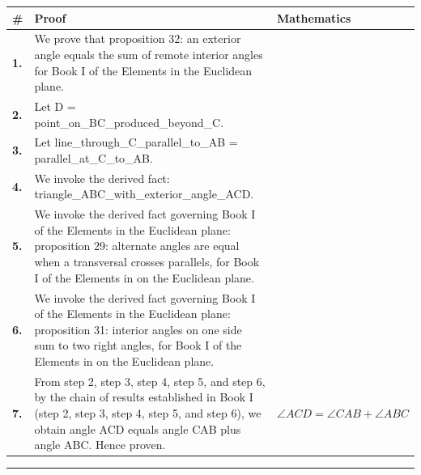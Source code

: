 \documentclass[11pt]{article}
\theoremstyle{definition}
\begin{document}
\begin{tabular}{@{} >{\raggedright\arraybackslash}p{} >{\raggedright\arraybackslash}p{} >{\raggedleft\arraybackslash}p{} @{}}
\textbf{\#} & \textbf{Proof} & \textbf{Mathematics} \\
\midrule
\textbf{1.} & We prove that proposition 32: an exterior angle equals the sum of remote interior angles for Book I of the Elements in the Euclidean plane. & \\[0.45em]
\textbf{2.} & Let D = point\_on\_BC\_produced\_beyond\_C. & \\[0.45em]
\textbf{3.} & Let line\_through\_C\_parallel\_to\_AB = parallel\_at\_C\_to\_AB. & \\[0.45em]
\textbf{4.} & We invoke the derived fact: triangle\_ABC\_with\_exterior\_angle\_ACD. & \\[0.45em]
\textbf{5.} & We invoke the derived fact governing Book I of the Elements in the Euclidean plane: proposition 29: alternate angles are equal when a transversal crosses parallels, for Book I of the Elements in on the Euclidean plane. & \\[0.45em]
\textbf{6.} & We invoke the derived fact governing Book I of the Elements in the Euclidean plane: proposition 31: interior angles on one side sum to two right angles, for Book I of the Elements in on the Euclidean plane. & \\[0.45em]
\textbf{7.} & From step 2, step 3, step 4, step 5, and step 6, by the chain of results established in Book I (step 2, step 3, step 4, step 5, and step 6), we obtain angle ACD equals angle CAB plus angle ABC. Hence proven. & $\displaystyle \angle ACD = \angle CAB + \angle ABC$ \\[0.45em]
\bottomrule
\end{tabular}
\label{thm:Geometry-Euclid Book I-proposition_32_an_exterior_angle_equals_the_sum_of_remote_interior_angles}
\par\medskip\hrule
\end{document}
